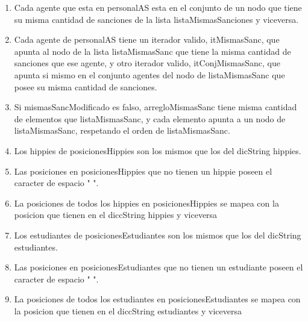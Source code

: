 \begin{enumerate}
	\item Cada agente que esta en personalAS esta en el conjunto de un nodo que tiene su misma cantidad de sanciones de la lista listaMismasSanciones y viceversa.

	\item Cada agente de personalAS tiene un iterador valido, itMismasSanc, que apunta al nodo de la lista listaMismasSanc que tiene la misma cantidad de sanciones que ese agente, y otro iterador valido, itConjMismasSanc, que apunta si mismo en el conjunto agentes del nodo de listaMismasSanc que posee su misma cantidad de sanciones.
	\item Si mismasSancModificado es falso, arregloMismasSanc tiene misma cantidad de elementos que listaMismasSanc, y cada elemento apunta a un nodo de listaMismasSanc, respetando el orden de listaMismasSanc.
	\item Los hippies de posicionesHippies son los mismos que los del dicString hippies.
	\item Las posiciones en posicionesHippies que no tienen un hippie poseen el caracter de espacio " ".
	\item La posiciones de todos los hippies en posicionesHippies se mapea con la posicion que tienen en el diccString hippies y viceversa
	\item Los estudiantes de posicionesEstudiantes son los mismos que los del dicString estudiantes.
	\item Las posiciones en posicionesEstudiantes que no tienen un estudiante poseen el caracter de espacio " ".
	\item La posiciones de todos los estudiantes en posicionesEstudiantes se mapea con la posicion que tienen en el diccString estudiantes y viceversa
	

\end{enumerate}

\pagebreak

